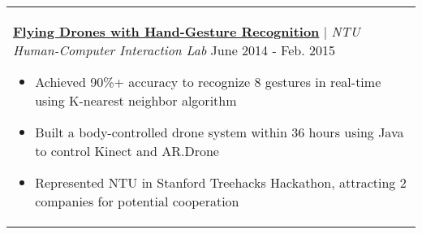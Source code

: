 \documentclass[letterpaper,11pt]{article} %
\begin{document}
{\begin{tabular}{p{18.5cm}}
\href{https://www.youtube.com/watch?v=jxsZaQ6PcXU}{\bf{Flying Drones with Hand-Gesture Recognition}} | {\it NTU Human-Computer Interaction Lab} \hfill  June 2014 - Feb. 2015
\begin{itemize}%
\item Achieved 90\%+ accuracy to recognize 8 gestures in real-time using K-nearest neighbor algorithm %
\item Built a body-controlled drone system within 36 hours using Java to control Kinect and AR.Drone
\item Represented NTU in Stanford Treehacks Hackathon, attracting 2 companies for potential cooperation \vspace*{-\baselineskip}
\end{itemize}\\

%
\end{tabular}

}
\end{document}
